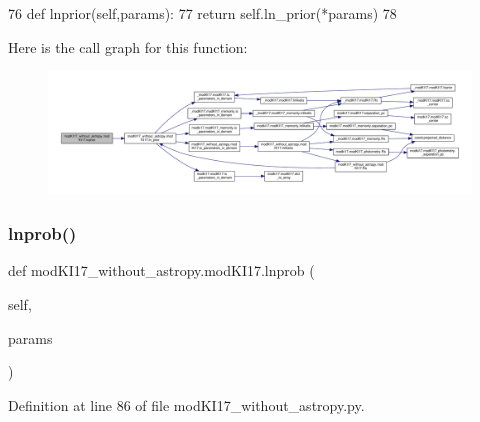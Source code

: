 \begin{DoxyCode}
76     \textcolor{keyword}{def }lnprior(self,params):
77         \textcolor{keywordflow}{return} self.ln\_prior(*params)
78             
\end{DoxyCode}
Here is the call graph for this function\+:\nopagebreak
\begin{figure}[H]
\begin{center}
\leavevmode
\includegraphics[width=350pt]{d3/df4/classmodKI17__without__astropy_1_1modKI17_abd872f61c836ff783aa00f80a94674b2_cgraph}
\end{center}
\end{figure}
\mbox{\label{classmodKI17__without__astropy_1_1modKI17_abd696e0c2e8175f37ed01a6d60799458}} 
\subsubsection{\texorpdfstring{lnprob()}{lnprob()}}
{\footnotesize\ttfamily def mod\+K\+I17\+\_\+without\+\_\+astropy.\+mod\+K\+I17.\+lnprob (\begin{DoxyParamCaption}\item[{}]{self,  }\item[{}]{params }\end{DoxyParamCaption})}



Definition at line 86 of file mod\+K\+I17\+\_\+without\+\_\+astropy.\+py.


